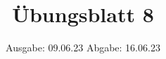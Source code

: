 

\title{Übungsblatt 8}
\date{%
  Ausgabe: 09.06.23 %
  \hspace{3em}
  Abgabe: 16.06.23 %
}



\maketitle
\thispagestyle{empty}
\tableofcontents
\newpage






